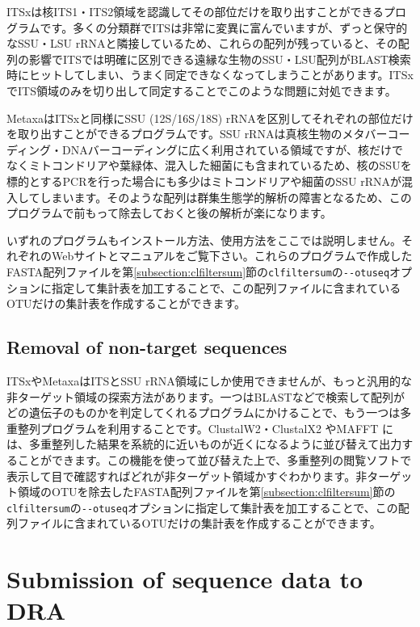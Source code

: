 \documentclass[titlepage,10pt,a4paper,english]{jsbook}
\begin{document}
ITSxは核ITS1・ITS2領域を認識してその部位だけを取り出すことができるプログラムです\citep{Bengtsson2013}。多くの分類群でITSは非常に変異に富んでいますが、ずっと保守的なSSU・LSU rRNAと隣接しているため、これらの配列が残っていると、その配列の影響でITSでは明確に区別できる遠縁な生物のSSU・LSU配列がBLAST検索時にヒットしてしまい、うまく同定できなくなってしまうことがあります。ITSxでITS領域のみを切り出して同定することでこのような問題に対処できます。

MetaxaはITSxと同様にSSU (12S/16S/18S) rRNAを区別してそれぞれの部位だけを取り出すことができるプログラムです\citep{Bengtsson2011}。SSU rRNAは真核生物のメタバーコーディング・DNAバーコーディングに広く利用されている領域ですが、核だけでなくミトコンドリアや葉緑体、混入した細菌にも含まれているため、核のSSUを標的とするPCRを行った場合にも多少はミトコンドリアや細菌のSSU rRNAが混入してしまいます。そのような配列は群集生態学的解析の障害となるため、このプログラムで前もって除去しておくと後の解析が楽になります。

いずれのプログラムもインストール方法、使用方法をここでは説明しません。それぞれのWebサイトとマニュアルをご覧下さい。これらのプログラムで作成したFASTA配列ファイルを第\ref{subsection:clfiltersum}節の\texttt{clfiltersum}の\texttt{{-}{-}otuseq}オプションに指定して集計表を加工することで、この配列ファイルに含まれているOTUだけの集計表を作成することができます。

\subsection{Removal of non-target sequences}

ITSxやMetaxaはITSとSSU rRNA領域にしか使用できませんが、もっと汎用的な非ターゲット領域の探索方法があります。一つはBLASTなどで検索して配列がどの遺伝子のものかを判定してくれるプログラムにかけることで、もう一つは多重整列プログラムを利用することです。ClustalW2・ClustalX2 \citep{Larkin2007}やMAFFT \citep{Katoh2013}には、多重整列した結果を系統的に近いものが近くになるように並び替えて出力することができます。この機能を使って並び替えた上で、多重整列の閲覧ソフトで表示して目で確認すればどれが非ターゲット領域かすぐわかります。非ターゲット領域のOTUを除去したFASTA配列ファイルを第\ref{subsection:clfiltersum}節の\texttt{clfiltersum}の\texttt{{-}{-}otuseq}オプションに指定して集計表を加工することで、この配列ファイルに含まれているOTUだけの集計表を作成することができます。

\section{Submission of sequence data to DRA}
\end{document}
